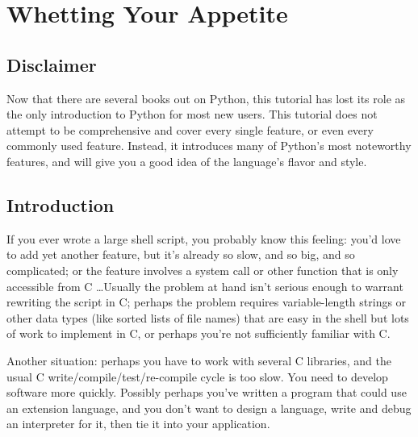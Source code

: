 \chapter{Whetting Your Appetite}

\section{Disclaimer}

Now that there are several books out on Python, this tutorial has lost
its role as the only introduction to Python for most new users.  This
tutorial does not attempt to be comprehensive and cover every single
feature, or even every commonly used feature.  Instead, it introduces
many of Python's most noteworthy features, and will give you a good
idea of the language's flavor and style.



\section{Introduction}

If you ever wrote a large shell script, you probably know this
feeling: you'd love to add yet another feature, but it's already so
slow, and so big, and so complicated; or the feature involves a system
call or other function that is only accessible from C \ldots Usually
the problem at hand isn't serious enough to warrant rewriting the
script in C; perhaps the problem requires variable-length strings or
other data types (like sorted lists of file names) that are easy in
the shell but lots of work to implement in C, or perhaps you're not
sufficiently familiar with C.

Another situation: perhaps you have to work with several C libraries,
and the usual C write/compile/test/re-compile cycle is too slow.  You
need to develop software more quickly.  Possibly perhaps you've
written a program that could use an extension language, and you don't
want to design a language, write and debug an interpreter for it, then
tie it into your application.

